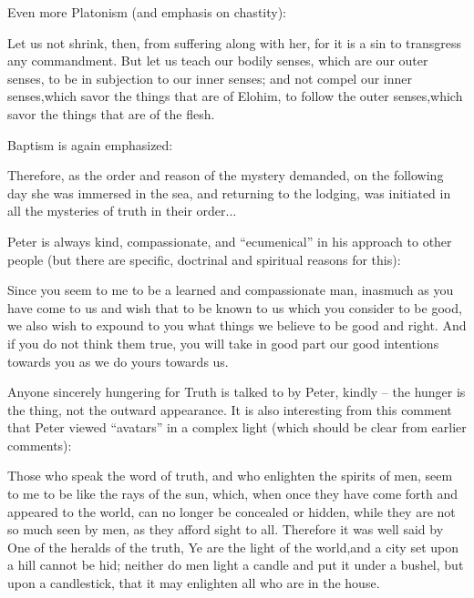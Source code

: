 Even more Platonism (and emphasis on chastity):

\begin{quotex}
Let us not shrink, then, from suffering along with her, for it is a sin to transgress any commandment. But let us teach our bodily senses, which are our outer senses, to be in subjection to our inner senses; and not compel our inner senses,which savor the things that are of Elohim, to follow the outer senses,which savor the things that are of the flesh.
\end{quotex}


Baptism is again emphasized:

\begin{quotex}
Therefore, as the order and reason of the mystery demanded, on the following day she was immersed in the sea, and returning to the lodging, was initiated in all the mysteries of truth in their order... \end{quotex}


Peter is always kind, compassionate, and ``ecumenical'' in his approach to other people (but there are specific, doctrinal and spiritual reasons for this):

\begin{quotex}
Since you seem to me to be a learned and compassionate man, inasmuch as you have come to us and wish that to be known to us which you consider to be good, we also wish to expound to you what things we believe to be good and right. And if you do not think them true, you will take in good part our good intentions towards you as we do yours towards us.
\end{quotex}


Anyone sincerely hungering for Truth is talked to by Peter, kindly -- the hunger is the thing, not the outward appearance. It is also interesting from this comment that Peter viewed ``avatars'' in a complex light (which should be clear from earlier comments):

\begin{quotex}
Those who speak the word of truth, and who enlighten the spirits of men, seem to me to be like the rays of the sun, which, when once they have come forth and appeared to the world, can no longer be concealed or hidden, while they are not so much seen by men, as they afford sight to all. Therefore it was well said by One of the heralds of the truth, Ye are the light of the world,and a city set upon a hill cannot be hid; neither do men light a candle and put it under a bushel, but upon a candlestick, that it may enlighten all who are in the house.
\end{quotex}


